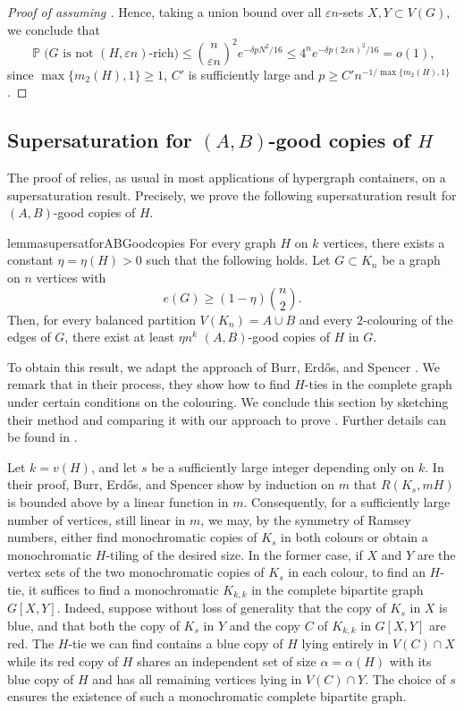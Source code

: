 \documentclass[a4paper,reqno,11pt]{amsart}
\theoremstyle{definition}
\theoremstyle{remark}
\renewcommand\Pr{\operatorname{\mathbb{P}}}
\renewcommand\geq{\geqslant}
\renewcommand\le{\leqslant}
\renewcommand\ge{\geqslant}
\begin{document}
\begin{proof}[Proof of  assuming ]
Hence, taking a union bound over all $\varepsilon n$-sets $X,Y \subset V(G)$, we conclude that
\[\Pr\big(\text{$G$ is not $(H,\varepsilon n)$-rich} \big) \le \binom{n}{\varepsilon n}^2e^{-\delta pN^2/16} \le 4^ne^{-\delta p(2\varepsilon n)^2/16} = o(1),\]
since $\max\{m_2(H),1\} \ge 1$, $C'$ is sufficiently large and $p \ge C'n^{-1/\max\{m_2(H),1\}}$.
\end{proof}

\subsection{Supersaturation for $(A,B)$-good copies of $H$} The proof of  relies, as usual in most applications of hypergraph containers, on a supersaturation result. Precisely, we prove the following supersaturation result for $(A,B)$-good copies of $H$.

\begin{restatable}{lemma}{supersatforABGoodcopies}
\label{lem:ABsuper}
For every graph $H$ on $k$ vertices, there exists a constant $\eta=\eta(H)>0$ such that the following holds. Let $G\subset K_n$ be a graph on $n$ vertices with
\[e(G) \geq (1-\eta)\binom{n}{2}.\]
Then, for every balanced partition $V(K_n) = A \cup B$ and every $2$-colouring of the edges of $G$, there exist at least $\eta n^k$ $(A,B)$-good copies of $H$ in $G$.
\end{restatable}

To obtain this result, we adapt the approach of Burr, Erd\H{o}s, and Spencer \cite{BES}. We remark that in their process, they show how to find $H$-ties in the complete graph under certain conditions on the colouring. We conclude this section by sketching their method and comparing it with our approach to prove . Further details can be found in .

Let $k=v(H)$, and let $s$ be a sufficiently large integer depending only on $k$. In their proof, Burr, Erd\H{o}s, and Spencer \cite{BES} show by induction on $m$ that $R(K_s,mH)$ is bounded above by a linear function in $m$. Consequently, for a sufficiently large number of vertices, still linear in $m$, we may, by the symmetry of Ramsey numbers, either find monochromatic copies of $K_s$ in both colours or obtain a monochromatic $H$-tiling of the desired size. In the former case, if $X$ and $Y$ are the vertex sets of the two monochromatic copies of $K_s$ in each colour, to find an $H$-tie, it suffices to find a monochromatic $K_{k,k}$ in the complete bipartite graph $G[X,Y]$. Indeed, suppose without loss of generality that the copy of $K_s$ in $X$ is blue, and that both the copy of $K_s$ in $Y$ and the copy $C$ of $K_{k,k}$ in $G[X,Y]$ are red. The $H$-tie we can find contains a blue copy of $H$ lying entirely in $V(C)\cap X$ while its red copy of $H$ shares an independent set of size $\alpha =\alpha(H)$ with its blue copy of $H$ and has all remaining vertices lying in $V(C)\cap Y$. The choice of $s$ ensures the existence of such a monochromatic complete bipartite graph.
\end{document}

